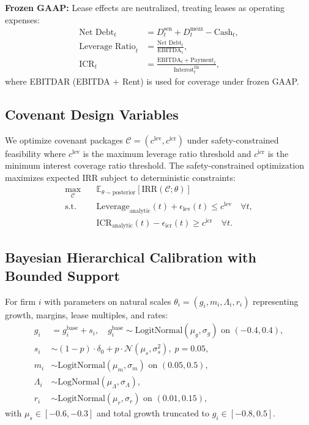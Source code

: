 \documentclass[11pt,a4paper]{article}
\newcommand{\E}{\mathbb{E}}
\numberwithin{equation}{section}
\theoremstyle{plain}
\theoremstyle{definition}
\begin{document}
\textbf{Frozen GAAP:} Lease effects are neutralized, treating leases as operating expenses:
\begin{align}
\text{Net Debt}_t &= D_t^{\text{sen}} + D_t^{\text{mezz}} - \text{Cash}_t, \\
\text{Leverage Ratio}_t &= \frac{\text{Net Debt}_t}{\text{EBITDA}_t}, \\
\text{ICR}_t &= \frac{\text{EBITDA}_t + \text{Payment}_t}{\text{Interest}_t^{\text{fin}}},
\end{align}
where EBITDAR (EBITDA + Rent) is used for coverage under frozen GAAP.

\subsection{Covenant Design Variables}

We optimize covenant packages $\mathcal{C} = (c^{\text{lev}}, c^{\text{icr}})$ under safety-constrained feasibility where $c^{\text{lev}}$ is the maximum leverage ratio threshold and $c^{\text{icr}}$ is the minimum interest coverage ratio threshold. The safety-constrained optimization maximizes expected IRR subject to deterministic constraints:
\begin{align}
\max_{\mathcal{C}} \quad &\E_{\theta \sim \text{posterior}}\!\left[\text{IRR}(\mathcal{C};\theta)\right] \\
\text{s.t.} \quad &\text{Leverage}_{\text{analytic}}(t) + \epsilon_{\text{lev}}(t) \leq c^{\text{lev}} \quad \forall t, \\
&\text{ICR}_{\text{analytic}}(t) - \epsilon_{\text{icr}}(t) \geq c^{\text{icr}} \quad \forall t.
\end{align}

\subsection{Bayesian Hierarchical Calibration with Bounded Support}

For firm $i$ with parameters on natural scales $\theta_i = (g_i, m_i, \Lambda_i, r_i)$ representing growth, margins, lease multiples, and rates:
\begin{align}
g_i &= g^{\text{base}}_i + s_i, \quad g^{\text{base}}_i \sim \text{LogitNormal}(\mu_g,\sigma_g) \text{ on } (-0.4,0.4), \\
s_i &\sim (1-p)\cdot \delta_0 + p\cdot \mathcal{N}(\mu_s,\sigma_s^2),\; p=0.05, \\
m_i &\sim \text{LogitNormal}(\mu_m,\sigma_m) \text{ on } (0.05,0.5), \\
\Lambda_i &\sim \text{LogNormal}(\mu_\Lambda,\sigma_\Lambda), \\
r_i &\sim \text{LogitNormal}(\mu_r,\sigma_r) \text{ on } (0.01,0.15),
\end{align}
with $\mu_s\in[-0.6,-0.3]$ and total growth truncated to $g_i\in[-0.8,0.5]$.
\end{document}

